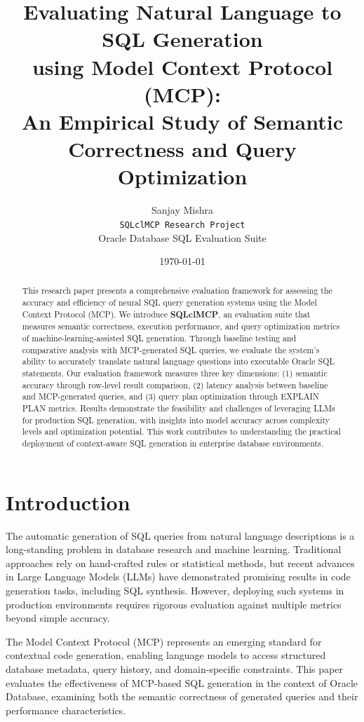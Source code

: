 \documentclass[11pt,a4paper]{article}
\title{\large \textbf{Evaluating Natural Language to SQL Generation\\using Model Context Protocol (MCP):\\An Empirical Study of Semantic Correctness and Query Optimization}}
\author{
    Sanjay Mishra\\
    \texttt{SQLclMCP Research Project}\\
    Oracle Database SQL Evaluation Suite
}
\date{\today}
\begin{document}
\maketitle

\begin{abstract}
    This research paper presents a comprehensive evaluation framework for assessing the accuracy and efficiency of neural SQL query generation systems using the Model Context Protocol (MCP). We introduce \textbf{SQLclMCP}, an evaluation suite that measures semantic correctness, execution performance, and query optimization metrics of machine-learning-assisted SQL generation. Through baseline testing and comparative analysis with MCP-generated SQL queries, we evaluate the system's ability to accurately translate natural language questions into executable Oracle SQL statements. Our evaluation framework measures three key dimensions: (1) semantic accuracy through row-level result comparison, (2) latency analysis between baseline and MCP-generated queries, and (3) query plan optimization through EXPLAIN PLAN metrics. Results demonstrate the feasibility and challenges of leveraging LLMs for production SQL generation, with insights into model accuracy across complexity levels and optimization potential. This work contributes to understanding the practical deployment of context-aware SQL generation in enterprise database environments.
\end{abstract}

\section{Introduction}

The automatic generation of SQL queries from natural language descriptions is a long-standing problem in database research and machine learning. Traditional approaches rely on hand-crafted rules or statistical methods, but recent advances in Large Language Models (LLMs) have demonstrated promising results in code generation tasks, including SQL synthesis. However, deploying such systems in production environments requires rigorous evaluation against multiple metrics beyond simple accuracy.\par

The Model Context Protocol (MCP) represents an emerging standard for contextual code generation, enabling language models to access structured database metadata, query history, and domain-specific constraints. This paper evaluates the effectiveness of MCP-based SQL generation in the context of Oracle Database, examining both the semantic correctness of generated queries and their performance characteristics.
\end{document}
